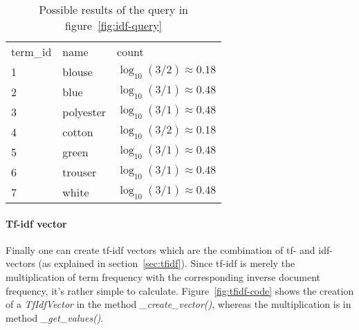 \begin{table}
    \center
    \begin{tabular}{ l | l | l } 
        \rowcolor{\dustRowHead}
        \multicolumn{3}{ c }{\textbf{idf}}\\\hline
        term\_id    & name      & count\\\hline
        1           & blouse    & $\log_{10}(3/2) \approx 0.18$\\
        2           & blue      & $\log_{10}(3/1) \approx 0.48$\\
        3           & polyester & $\log_{10}(3/1) \approx 0.48$\\
        4           & cotton    & $\log_{10}(3/2) \approx 0.18$\\
        5           & green     & $\log_{10}(3/1) \approx 0.48$\\
        6           & trouser   & $\log_{10}(3/1) \approx 0.48$\\
        7           & white     & $\log_{10}(3/1) \approx 0.48$\\
    \end{tabular}
    \caption{Possible results of the query in figure~\ref{fig:idf-query}}
    \label{tab:idf-query-result}
\end{table}

\paragraph{Tf-idf vector}
Finally one can create tf-idf vectors which are the combination of tf- and idf-vectors (as explained in section~\ref{sec:tfidf}).
Since tf-idf is merely the multiplication of term frequency with the corresponding inverse document frequency, it's rather simple to calculate.
Figure~\ref{fig:tfidf-code} shows the creation of a \textit{TfIdfVector} in the method \textit{\_create\_vector()}, whereas the multiplication is in method \textit{\_get\_values()}.


